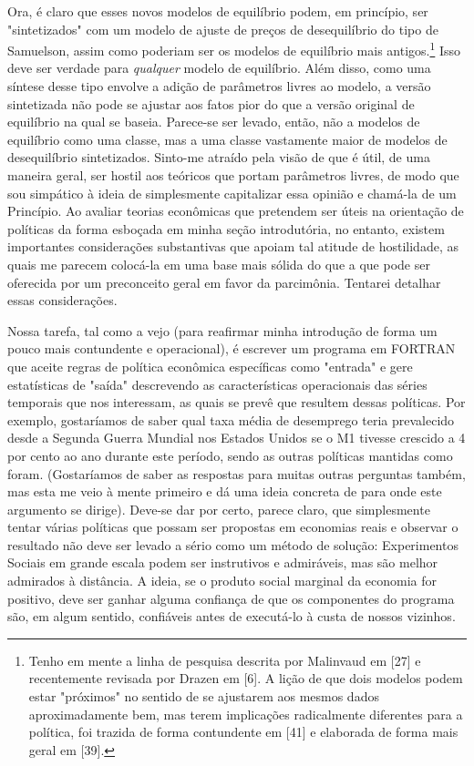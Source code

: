\documentclass[12pt]{article}
\begin{document}
Ora, é claro que esses novos modelos de equilíbrio podem, em princípio, ser "sintetizados" com um modelo de ajuste de preços de desequilíbrio do tipo de Samuelson, assim como poderiam ser os modelos de equilíbrio mais antigos.\footnote{Tenho em mente a linha de pesquisa descrita por Malinvaud em [27] e recentemente revisada por Drazen em [6]. A lição de que dois modelos podem estar "próximos" no sentido de se ajustarem aos mesmos dados aproximadamente bem, mas terem implicações radicalmente diferentes para a política, foi trazida de forma contundente em [41] e elaborada de forma mais geral em [39].} Isso deve ser verdade para \textit{qualquer} modelo de equilíbrio. Além disso, como uma síntese desse tipo envolve a adição de parâmetros livres ao modelo, a versão sintetizada não pode se ajustar aos fatos pior do que a versão original de equilíbrio na qual se baseia. Parece-se ser levado, então, não a modelos de equilíbrio como uma classe, mas a uma classe vastamente maior de modelos de desequilíbrio sintetizados. Sinto-me atraído pela visão de que é útil, de uma maneira geral, ser hostil aos teóricos que portam parâmetros livres, de modo que sou simpático à ideia de simplesmente capitalizar essa opinião e chamá-la de um Princípio. Ao avaliar teorias econômicas que pretendem ser úteis na orientação de políticas da forma esboçada em minha seção introdutória, no entanto, existem importantes considerações substantivas que apoiam tal atitude de hostilidade, as quais me parecem colocá-la em uma base mais sólida do que a que pode ser oferecida por um preconceito geral em favor da parcimônia. Tentarei detalhar essas considerações.

Nossa tarefa, tal como a vejo (para reafirmar minha introdução de forma um pouco mais contundente e operacional), é escrever um programa em FORTRAN que aceite regras de política econômica específicas como "entrada" e gere estatísticas de "saída" descrevendo as características operacionais das séries temporais que nos interessam, as quais se prevê que resultem dessas políticas. Por exemplo, gostaríamos de saber qual taxa média de desemprego teria prevalecido desde a Segunda Guerra Mundial nos Estados Unidos se o M1 tivesse crescido a 4 por cento ao ano durante este período, sendo as outras políticas mantidas como foram. (Gostaríamos de saber as respostas para muitas outras perguntas também, mas esta me veio à mente primeiro e dá uma ideia concreta de para onde este argumento se dirige). Deve-se dar por certo, parece claro, que simplesmente tentar várias políticas que possam ser propostas em economias reais e observar o resultado não deve ser levado a sério como um método de solução: Experimentos Sociais em grande escala podem ser instrutivos e admiráveis, mas são melhor admirados à distância. A ideia, se o produto social marginal da economia for positivo, deve ser ganhar alguma confiança de que os componentes do programa são, em algum sentido, confiáveis antes de executá-lo à custa de nossos vizinhos.
\end{document}
